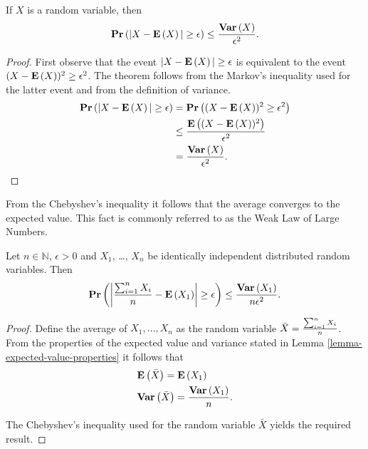 \begin{theorem}
\label{theorem-chebyshev-inequality}
If $X$ is a random variable, then \[ \mathbf{Pr}\left(|X - \mathbf{E}\left(X\right)| \geq \epsilon\right) \leq \frac{\mathbf{Var}\left(X\right)}{\epsilon ^ 2} \text{.} \]
\end{theorem}
\begin{proof}
First observe that the event $|X - \mathbf{E}\left(X\right)| \geq \epsilon$ is equivalent to the event $(X - \mathbf{E}\left(X\right)) ^ 2 \geq \epsilon ^ 2$. The theorem follows from the Markov's inequality used for the latter event and from the definition of variance. 
\[
\begin{split}
\mathbf{Pr}\left(|X - \mathbf{E}\left(X\right)| \geq \epsilon\right) 
	& = \mathbf{Pr}\left((X - \mathbf{E}\left(X\right)) ^ 2 \geq \epsilon ^ 2\right) \\
	& \leq \frac{\mathbf{E}\left((X - \mathbf{E}\left(X\right)) ^ 2\right)}{\epsilon ^ 2} \\
	& = \frac{\mathbf{Var}\left(X\right)}{\epsilon ^ 2} \text{.}
\end{split}
\]
\end{proof}

From the Chebyshev's inequality it follows that the average converges to the expected value. This fact is commonly referred to as the Weak Law of Large Numbers.
\begin{theorem}
\label{theorem-weak-law-of-large-numbers}
Let $n \in \mathbb{N}$, $\epsilon > 0$ and $X_1$, \dots, $X_n$ be identically independent distributed random variables. Then 
\[
\mathbf{Pr}\left(\left| \frac{\sum\displaylimits_{i = 1}^{n} X_i}{n} - \mathbf{E}\left(X_1\right) \right| \geq \epsilon\right) \leq \frac{\mathbf{Var}\left(X_1\right)}{n\epsilon ^ 2} \text{.}
\]
\end{theorem}
\begin{proof}
Define the average of $X_1, \dots, X_n$ as the random variable $\bar{X} = \frac{\sum\displaylimits_{i = 1}^{n} X_i}{n}$. From the properties of the expected value and variance stated in Lemma \ref{lemma-expected-value-properties} it follows that 
\[
\begin{split}
& \mathbf{E}\left(\bar{X}\right) = \mathbf{E}\left(X_1\right) \\
& \mathbf{Var}\left(\bar{X}\right) = \frac{\mathbf{Var}\left(X_1\right)}{n} \text{.}
\end{split}
\]

The Chebyshev's inequality used for the random variable $\bar{X}$ yields the required result.
\end{proof}

